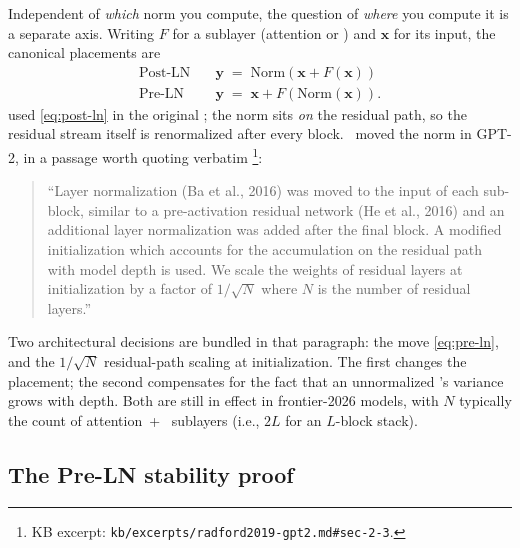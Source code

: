 Independent of \emph{which} norm you compute, the question of
\emph{where} you compute it is a separate axis. Writing $F$ for a
sublayer (attention or ) and $\mathbf{x}$ for its input, the
canonical placements are
\begin{align}
  \text{Post-LN} \quad & \mathbf{y} \;=\; \mathrm{Norm}(\mathbf{x} + F(\mathbf{x}))
  \label{eq:post-ln} \\
  \text{Pre-LN} \quad & \mathbf{y} \;=\; \mathbf{x} + F(\mathrm{Norm}(\mathbf{x})).
  \label{eq:pre-ln}
\end{align}
\citet{vaswani2017} used  \eqref{eq:post-ln} in the original
; the norm sits \emph{on} the residual path, so the residual
stream itself is renormalized after every block.~\citet{radford2019-gpt2}
moved the norm in GPT-2, in a passage worth quoting
verbatim%
\footnote{KB excerpt: \texttt{kb/excerpts/radford2019-gpt2.md\#sec-2-3}.}:
\begin{quote}
``Layer normalization (Ba et al., 2016) was moved to the input of each
sub-block, similar to a pre-activation residual network (He et al.,
2016) and an additional layer normalization was added after the final
 block. A modified initialization which accounts for the
accumulation on the residual path with model depth is used. We scale
the weights of residual layers at initialization by a factor of
$1/\sqrt{N}$ where $N$ is the number of residual layers.''
\citep[\S 2.3]{radford2019-gpt2}
\end{quote}
Two architectural decisions are bundled in that paragraph: the 
move \eqref{eq:pre-ln}, and the $1/\sqrt{N}$ residual-path scaling at
initialization. The first changes the placement; the second compensates
for the fact that an unnormalized 's variance grows with
depth. Both are still in effect in frontier-2026 models, with $N$
typically the count of attention~+~ sublayers (i.e., $2L$ for an
$L$-block  stack).

\subsection{The Pre-LN stability proof}
\label{sec:norm-stability}

